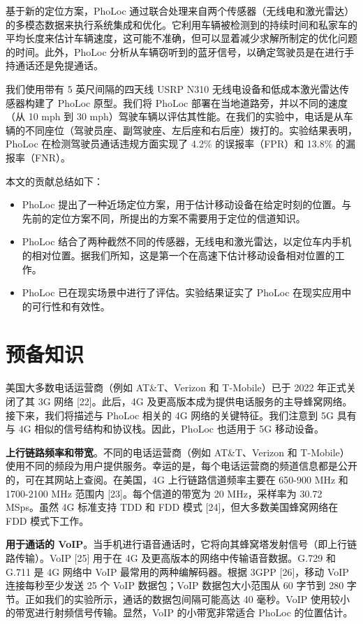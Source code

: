 \documentclass[journal, onecolumn]{IEEEtran}
\begin{document}
基于新的定位方案，PhoLoc 通过联合处理来自两个传感器（无线电和激光雷达）的多模态数据来执行系统集成和优化。它利用车辆被检测到的持续时间和私家车的平均长度来估计车辆速度，这可能不准确，但可以显着减少求解所制定的优化问题的时间。此外，PhoLoc 分析从车辆窃听到的蓝牙信号，以确定驾驶员是在进行手持通话还是免提通话。

我们使用带有 5 英尺间隔的四天线 USRP N310 无线电设备和低成本激光雷达传感器构建了 PhoLoc 原型。我们将 PhoLoc 部署在当地道路旁，并以不同的速度（从 10 mph 到 30 mph）驾驶车辆以评估其性能。在我们的实验中，电话是从车辆的不同座位（驾驶员座、副驾驶座、左后座和右后座）拨打的。实验结果表明，PhoLoc 在检测驾驶员通话违规方面实现了 4.2\% 的误报率（FPR）和 13.8\% 的漏报率（FNR）。

本文的贡献总结如下：
\begin{itemize}
    \item PhoLoc 提出了一种近场定位方案，用于估计移动设备在给定时刻的位置。与先前的定位方案不同，所提出的方案不需要用于定位的信道知识。
    \item PhoLoc 结合了两种截然不同的传感器，无线电和激光雷达，以定位车内手机的相对位置。据我们所知，这是第一个在高速下估计移动设备相对位置的工作。
    \item PhoLoc 已在现实场景中进行了评估。实验结果证实了 PhoLoc 在现实应用中的可行性和有效性。
\end{itemize}

\section{预备知识}

美国大多数电话运营商（例如 AT\&T、Verizon 和 T-Mobile）已于 2022 年正式关闭了其 3G 网络 [22]。此后，4G 及更高版本成为提供电话服务的主导蜂窝网络。接下来，我们将描述与 PhoLoc 相关的 4G 网络的关键特征。我们注意到 5G 具有与 4G 相似的信号结构和协议栈。因此，PhoLoc 也适用于 5G 移动设备。

\textbf{上行链路频率和带宽}。不同的电话运营商（例如 AT\&T、Verizon 和 T-Mobile）使用不同的频段为用户提供服务。幸运的是，每个电话运营商的频道信息都是公开的，可在其网站上查阅。在美国，4G 上行链路信道频率主要在 650-900 MHz 和 1700-2100 MHz 范围内 [23]。每个信道的带宽为 20 MHz，采样率为 30.72 MSps。虽然 4G 标准支持 TDD 和 FDD 模式 [24]，但大多数美国蜂窝网络在 FDD 模式下工作。

\textbf{用于通话的 VoIP}。当手机进行语音通话时，它将向其蜂窝塔发射信号（即上行链路传输）。VoIP [25] 用于在 4G 及更高版本的网络中传输语音数据。G.729 和 G.711 是 4G 网络中 VoIP 最常用的两种编解码器。根据 3GPP [26]，移动 VoIP 连接每秒至少发送 25 个 VoIP 数据包；VoIP 数据包大小范围从 60 字节到 280 字节。正如我们的实验所示，通话的数据包间隔可能高达 40 毫秒。VoIP 使用较小的带宽进行射频信号传输。显然，VoIP 的小带宽非常适合 PhoLoc 的位置估计。
\end{document}
